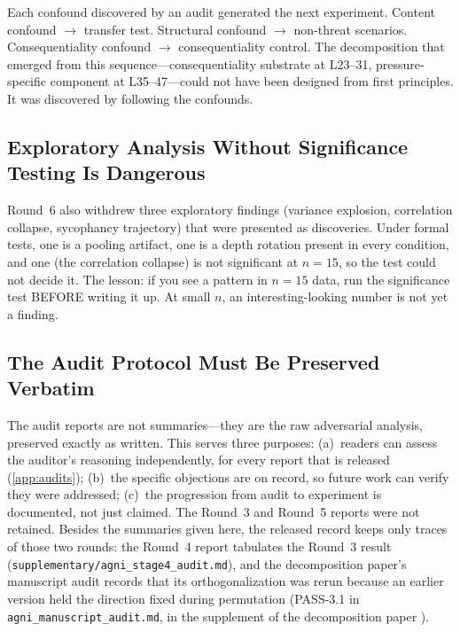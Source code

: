 \documentclass[11pt,letterpaper]{article}
\begin{document}
Each confound discovered by an audit generated the next experiment. Content confound $\to$ transfer
test. Structural confound $\to$ non-threat scenarios. Consequentiality confound $\to$ consequentiality
control. The decomposition that emerged from this sequence---consequentiality substrate at L23--31,
pressure-specific component at L35--47---could not have been designed from first principles. It was
discovered by following the confounds.

\subsection{Exploratory Analysis Without Significance Testing Is Dangerous}

Round~6 also withdrew three exploratory findings (variance explosion, correlation collapse, sycophancy
trajectory) that were presented as discoveries. Under formal tests, one is a pooling artifact, one is a
depth rotation present in every condition, and one (the correlation collapse) is not significant at
$n=15$, so the test could not decide it. The lesson: if you see a pattern in $n=15$ data, run the
significance test BEFORE writing it up. At small $n$, an interesting-looking number is not yet a finding.

\subsection{The Audit Protocol Must Be Preserved Verbatim}

The audit reports are not summaries---they are the raw adversarial analysis, preserved exactly as
written. This serves three purposes: (a)~readers can assess the auditor's reasoning independently,
for every report that is released (\cref{app:audits}); (b)~the specific objections are on record, so
future work can verify they were addressed; (c)~the progression from audit to experiment is
documented, not just claimed. The Round~3 and Round~5 reports were not retained. Besides the
summaries given here, the released record keeps only traces of those two rounds: the Round~4 report
tabulates the Round~3 result (\texttt{supplementary/agni\_stage4\_audit.md}), and the decomposition
paper's manuscript audit records that its orthogonalization was rerun because an earlier version held
the direction fixed during permutation (PASS-3.1 in \texttt{agni\_manuscript\_audit.md}, in the
supplement of the decomposition paper \cite{cc2026composites}).

\end{document}

